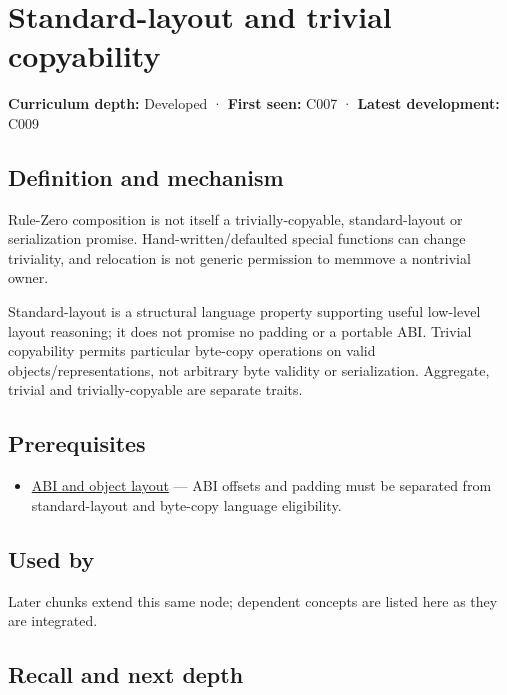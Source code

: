 \hypertarget{appendix-958870a64c53}{}
\section{Standard-layout and trivial copyability}\label{appendix-958870a64c53-standard-layout-and-trivial-copyability}

\textbf{Curriculum depth:} Developed · \textbf{First seen:} C007 · \textbf{Latest development:} C009

\subsection{Definition and mechanism}\label{appendix-958870a64c53-definition-and-mechanism}

Rule-Zero composition is not itself a trivially-copyable, standard-layout or serialization promise. Hand-written/defaulted special functions can change triviality, and relocation is not generic permission to memmove a nontrivial owner.

Standard-layout is a structural language property supporting useful low-level layout reasoning; it does not promise no padding or a portable ABI. Trivial copyability permits particular byte-copy operations on valid objects/representations, not arbitrary byte validity or serialization. Aggregate, trivial and trivially-copyable are separate traits.

\subsection{Prerequisites}\label{appendix-958870a64c53-prerequisites}

\begin{itemize}
\tightlist
\item
  \hyperref[appendix-c4ac6bb0fff8]{ABI and object layout} --- ABI offsets and padding must be separated from standard-layout and byte-copy language eligibility.
\end{itemize}

\subsection{Used by}\label{appendix-958870a64c53-used-by}

Later chunks extend this same node; dependent concepts are listed here as they are integrated.

\subsection{Recall and next depth}\label{appendix-958870a64c53-recall-and-next-depth}

